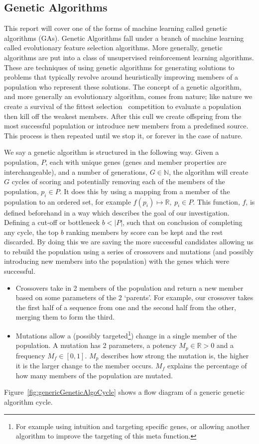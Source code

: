 \subsection{Genetic Algorithms}\label{subsec:geneticAlgorithms}
This report will cover one of the forms of machine learning called genetic algorithms (GAs).
Genetic Algorithms fall under a branch of machine learning called evolutionary feature selection algorithms.
More generally, genetic algorithms are put into a class of unsupervised reinforcement learning algorithms.
These are techniques of using genetic algorithms for generating solutions to problems that typically revolve around heuristically improving members of a population who represent these solutions.
The concept of a genetic algorithm, and more generally an evolutionary algorithm, comes from nature;
like nature we create a survival of the fittest selection~\cite{darwin2009origin} competition to evaluate a population then kill off the weakest members.
After this cull we create offspring from the most successful population or introduce new members from a predefined source.
This process is then repeated until we stop it, or forever in the case of nature.

We say a genetic algorithm is structured in the following way.
Given a population, \(P\), each with unique genes (genes and member properties are interchangeable), and a number of generations, \(G\in \mathbb{N}\), the algorithm will create \(G\) cycles of scoring and potentially removing each of the members of the population, \(p_i \in P\).
It does this by using a mapping from a member of the population to an ordered set, for example \(f(p_i)\mapsto \mathbb{R},\ p_i \in P\).
This function, \(f\), is defined beforehand in a way which describes the goal of our investigation.
Defining a cut-off or bottleneck \(b<|P|\), such that on conclusion of completing any cycle, the top \(b\) ranking members by score can be kept and the rest discarded.
By doing this we are saving the more successful candidates allowing us to rebuild the population using a series of crossovers and mutations (and possibly introducing new members into the population) with the genes which were successful.

\begin{itemize}
    \item Crossovers take in 2 members of the population and return a new member based on some parameters of the 2 `parents'.
    For example, our crossover takes the first half of a sequence from one and the second half from the other, merging them to form the third.
    \item Mutations allow a (possibly targeted\footnote{For example using intuition and targeting specific genes, or allowing another algorithm to improve the targeting of this meta function.}) change in a single member of the population.
    A mutation has 2 parameters, a potency \(M_p\in \mathbb{R}>0\) and a frequency \(M_f\in [0,1]\).
    \(M_p\) describes how strong the mutation is, the higher it is the larger change to the member occurs.
    \(M_f\) explains the percentage of how many members of the population are mutated.
\end{itemize}
Figure~\ref{fig:genericGeneticAlgoCycle} shows a flow diagram of a generic genetic algorithm cycle.

